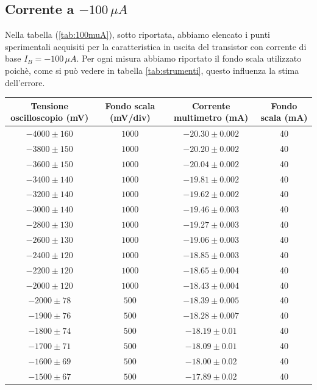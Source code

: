 \documentclass[]{article}
\begin{document}
\subsection{Corrente a $ -100\,\mu A $}
Nella tabella (\ref{tab:100muA}), sotto riportata, abbiamo elencato i punti sperimentali acquisiti per la caratteristica in uscita del transistor con corrente di base $ I_{B}= -100\,\mu A $. Per ogni misura abbiamo riportato il fondo scala utilizzato poichè, come si può vedere in tabella \ref{tab:strumenti}, questo influenza la stima dell'errore.
	\begin{table}[H]
		\centering
	\begin{tabular}{|c|c|c|c|}
		\hline
		Tensione oscilloscopio (mV)& Fondo scala (mV/div) & Corrente multimetro (mA) &Fondo scala (mA)\\
		\hline
		$ -4000\pm 160 $ &$ 1000 $ & $ -20.30\pm 0.002 $ &40\\
		\hline
		$-3800\pm150 $ &$ 1000 $ & $ -20.20\pm0.002 $ &40 \\
		\hline
		$ -3600\pm 150 $ &$ 1000 $ & $ -20.04\pm 0.002 $ &40 \\
		\hline
		$ -3400\pm 140 $ &$ 1000 $ & $ -19.81\pm 0.002 $ &40 \\
		\hline
		$ -3200\pm 140 $ &$ 1000 $ & $-19.62\pm 0.002$ &40 \\
		\hline
		$ -3000\pm 140 $ &$ 1000 $ & $ -19.46\pm 0.003 $ &40 \\
		\hline
		$ -2800\pm 130 $ &$ 1000 $ & $ -19.27\pm 0.003 $ &40 \\
		\hline
		$ -2600\pm 130 $ &$ 1000 $ & $ -19.06\pm 0.003 $ &40 \\
		\hline
		$ -2400\pm 120 $ &$ 1000 $ & $ -18.85\pm 0.003 $ &40 \\
		\hline
		$ -2200\pm 120 $ &$ 1000 $ & $ -18.65\pm 0.004 $ &40 \\
		\hline
		$ -2000\pm 120 $ &$ 1000 $ & $ -18.43\pm0.004 $  &40\\
		\hline
		$ -2000\pm 78 $ &$ 500 $ & $ -18.39\pm0.005 $  &40\\
		\hline
		$ -1900\pm 76 $ &$ 500 $ & $ -18.28\pm0.007 $  &40\\
		\hline
		$ -1800\pm 74 $ &$ 500 $ & $ -18.19\pm 0.01 $ &40 \\
		\hline
		$ -1700\pm 71 $ &$ 500 $ & $ -18.09\pm 0.01 $ &40 \\
		\hline
		$ -1600\pm 69 $ &$ 500 $ & $ -18.00\pm 0.02 $ &40 \\
		\hline
		$ -1500\pm 67 $ &$ 500 $ & $ -17.89\pm 0.02 $ &40 \\

\end{tabular}
\end{table}
\end{document}
